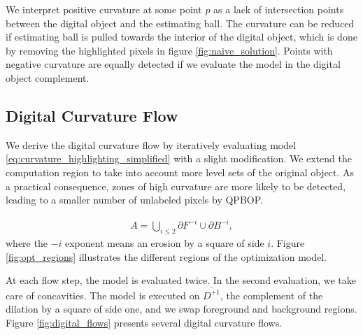 \documentclass[runningheads]{llncs}
\begin{document}
We interpret positive curvature at some point $p$ as a lack of intersection points between the digital object and the estimating ball. The curvature can be reduced if estimating ball is pulled towards the interior of the digital object, which is done by removing the highlighted pixels in figure \ref{fig:naive_solution}. Points with negative curvature are equally detected if we evaluate the model in the digital object complement.

\subsection{Digital Curvature Flow}

We derive the digital curvature flow by iteratively evaluating  model \eqref{eq:curvature_highlighting_simplified} with a slight modification. We extend the computation region to take into account more level sets of the original object. As a practical consequence, zones of high curvature are more likely to be detected, leading to a smaller number of unlabeled pixels by QPBOP.

\begin{align*}
	A = \bigcup_{i\leq2}{ \partial F^{-i} \cup \partial B^{-i} },
\end{align*}
where the $-i$ exponent means an erosion by a square of side $i$. Figure \ref{fig:opt_regions} illustrates the different regions of the optimization model. 

At each flow step, the model is evaluated twice. In the second evaluation, we take care of concavities. The model is executed on $\overline{D^{+1}}$, the complement of the dilation by a square of side one, and we swap foreground and background regions. Figure \ref{fig:digital_flows} presents several digital curvature flows.
\end{document}
